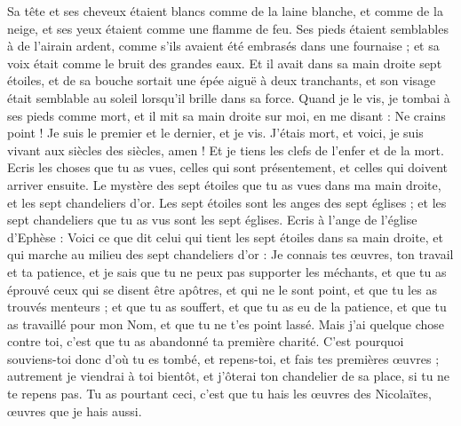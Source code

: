 \begin{multicols}{2}
Sa tête et ses cheveux étaient blancs comme de la laine blanche, et comme de la neige, et ses yeux étaient comme une flamme de feu.
Ses pieds étaient semblables à de l'airain ardent, comme s'ils avaient été embrasés dans une fournaise ; et sa voix était comme le bruit des grandes eaux.
Et il avait dans sa main droite sept étoiles, et de sa bouche sortait une épée aiguë à deux tranchants, et son visage était semblable au soleil lorsqu’il brille dans sa force.
Quand je le vis, je tombai à ses pieds comme mort, et il mit sa main droite sur moi, en me disant : Ne crains point ! Je suis le premier et le dernier,
et je vis. J’étais mort, et voici, je suis vivant aux siècles des siècles, amen ! Et je tiens les clefs de l'enfer{} et de la mort.
Ecris les choses que tu as vues, celles qui sont présentement, et celles qui doivent arriver ensuite.
Le mystère des sept étoiles que tu as vues dans ma main droite, et les sept chandeliers d'or. Les sept étoiles sont les anges des sept églises ; et les sept chandeliers que tu as vus sont les sept églises.
\VerseOne{}Ecris à l'ange{} de l'église d'Ephèse : Voici ce que dit celui qui tient les sept étoiles dans sa main droite, et qui marche au milieu des sept chandeliers d'or :
Je connais tes œuvres, ton travail et ta patience, et je sais que tu ne peux pas supporter les méchants, et que tu as éprouvé ceux qui se disent être apôtres, et qui ne le sont point, et que tu les as trouvés menteurs ;
et que tu as souffert, et que tu as eu de la patience, et que tu as travaillé pour mon Nom, et que tu ne t'es point lassé.
Mais j'ai quelque chose contre toi, c'est que tu as abandonné ta première charité{}.
C'est pourquoi souviens-toi donc d'où tu es tombé, et repens-toi, et fais tes premières œuvres ; autrement je viendrai à toi bientôt, et j'ôterai ton chandelier de sa place, si tu ne te repens pas.
Tu as pourtant ceci, c’est que tu hais les œuvres des Nicolaïtes{}, œuvres que je hais aussi.

\end{multicols}
